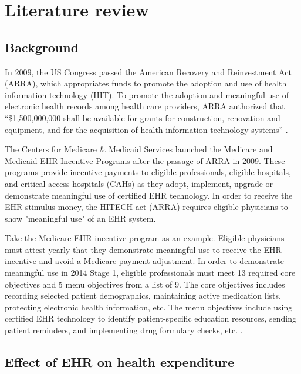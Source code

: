 \documentclass[12pt]{report}
\begin{document}
\chapter{Literature review}
\label{chapter:lit}
\section{Background}

In 2009, the US Congress passed the American Recovery and Reinvestment Act (ARRA), which appropriates funds to promote the adoption and use of health information technology (HIT). To promote the adoption and meaningful use of electronic health records among health care providers, ARRA authorized that ``\$1,500,000,000 shall be available for grants for construction, renovation and equipment, and for the acquisition of health information technology systems'' \citep{AARALaw}. 

The Centers for Medicare \& Medicaid Services launched the Medicare and Medicaid EHR Incentive Programs after the passage of ARRA in 2009. These programs provide incentive payments to eligible professionals, eligible hospitals, and critical access hospitals (CAHs) as they adopt, implement, upgrade or demonstrate meaningful use of certified EHR technology. In order to receive the EHR stimulus money, the HITECH act (ARRA) requires eligible physicians to show "meaningful use" of an EHR system.

Take the Medicare EHR incentive program as an example. Eligible physicians must attest yearly that they demonstrate meaningful use to receive the EHR incentive and avoid a Medicare payment adjustment. In order to demonstrate meaningful use in 2014 Stage 1, eligible professionals must meet 13 required core objectives and 5 menu objectives from a list of 9. The core objectives includes recording selected patient demographics, maintaining active medication lists, protecting electronic health information, etc. The menu objectives include using certified EHR technology to identify patient-specific education resources, sending patient reminders, and implementing drug formulary checks, etc. \citep{stage1}.

\section{Effect of EHR on health expenditure}
\end{document}
